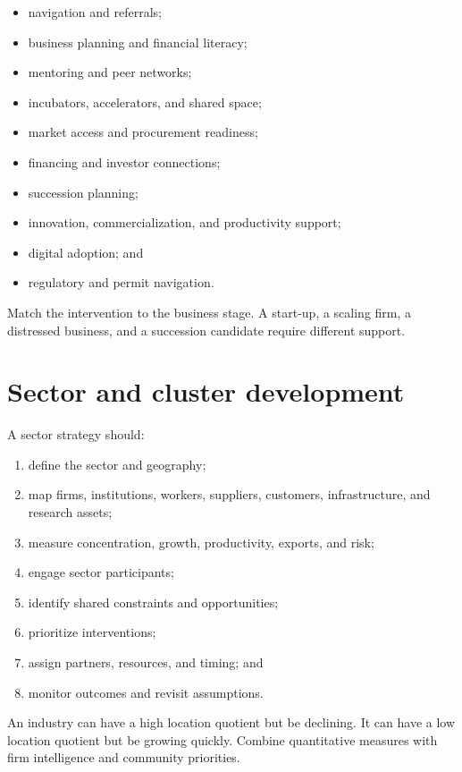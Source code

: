 \documentclass[11pt,letterpaper,oneside,openany]{book}
\begin{document}
\begin{itemize}
\item navigation and referrals;
\item business planning and financial literacy;
\item mentoring and peer networks;
\item incubators, accelerators, and shared space;
\item market access and procurement readiness;
\item financing and investor connections;
\item succession planning;
\item innovation, commercialization, and productivity support;
\item digital adoption; and
\item regulatory and permit navigation.
\end{itemize}


Match the intervention to the business stage. A start-up, a scaling firm, a distressed business, and a succession candidate require different support.


\section[Sector and cluster development]{Sector and cluster development}
A sector strategy should:


\begin{enumerate}
\item define the sector and geography;
\item map firms, institutions, workers, suppliers, customers, infrastructure, and research assets;
\item measure concentration, growth, productivity, exports, and risk;
\item engage sector participants;
\item identify shared constraints and opportunities;
\item prioritize interventions;
\item assign partners, resources, and timing; and
\item monitor outcomes and revisit assumptions.
\end{enumerate}


An industry can have a high location quotient but be declining. It can have a low location quotient but be growing quickly. Combine quantitative measures with firm intelligence and community priorities.
\end{document}

